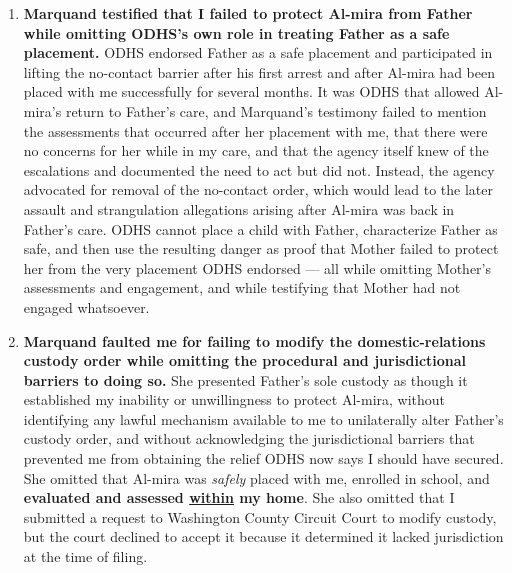 \documentclass[10pt,a4paper,roman]{moderncv}
\begin{document}
\begin{enumerate}[label=\arabic*., leftmargin=0.5in, itemsep=0.85em]
		\item \textbf{Marquand testified that I failed to protect Al-mira from Father while omitting ODHS's own role in treating Father as a safe placement.} ODHS endorsed Father as a safe placement and participated in lifting the no-contact barrier after his first arrest and after Al-mira had been placed with me successfully for several months. It was ODHS that allowed Al-mira's return to Father's care, and Marquand's testimony failed to mention the assessments that occurred after her placement with me, that there were no concerns for her while in my care, and that the agency itself knew of the escalations and documented the need to act but did not. Instead, the agency advocated for removal of the no-contact order, which would lead to the later assault and strangulation allegations arising after Al-mira was back in Father's care. ODHS cannot place a child with Father, characterize Father as safe, and then use the resulting danger as proof that Mother failed to protect her from the very placement ODHS endorsed --- all while omitting Mother's assessments and engagement, and while testifying that Mother had not engaged whatsoever.
		
		\item \textbf{Marquand faulted me for failing to modify the domestic-relations custody order while omitting the procedural and jurisdictional barriers to doing so.} She presented Father's sole custody as though it established my inability or unwillingness to protect Al-mira, without identifying any lawful mechanism available to me to unilaterally alter Father's custody order, and without acknowledging the jurisdictional barriers that prevented me from obtaining the relief ODHS now says I should have secured. She omitted that Al-mira was \emph{safely} placed with me, enrolled in school, and \textbf{evaluated and assessed \underline{within} my home}. She also omitted that I submitted a request to Washington County Circuit Court to modify custody, but the court declined to accept it because it determined it lacked jurisdiction at the time of filing.
		

\end{enumerate}
\end{document}
